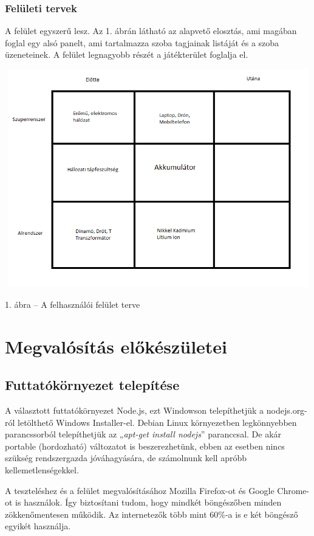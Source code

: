 \documentclass[]{article}
\begin{document}
\subsubsection{Felületi tervek}

A felület egyszerű lesz. Az 1. ábrán látható az alapvető elosztás, ami
magában foglal egy alsó panelt, ami tartalmazza szoba tagjainak listáját
és a szoba üzeneteinek. A felület legnagyobb részét a játékterület
foglalja el.

\includegraphics[width=5.375in,height=3.73238in]{media/image1.png}

1. ábra -- A felhasználói felület terve


\section{Megvalósítás
előkészületei}


\subsection{Futtatókörnyezet
telepítése}

A választott futtatókörnyezet Node.js, ezt Windowson telepíthetjük a
nodejs.org-ról letölthető Windows Installer-el. Debian Linux
környezetben legkönnyebben parancssorból telepíthetjük az „\emph{apt-get
install nodejs}'' paranccsal. De akár portable (hordozható) változatot
is beszerezhetünk, ebben az esetben nincs szükség rendszergazda
jóváhagyására, de számolnunk kell apróbb kellemetlenségekkel.

A teszteléshez és a felület megvalósításához Mozilla Firefox-ot és
Google Chrome-ot is használok. Így biztosítani tudom, hogy mindkét
böngészőben minden zökkenőmentesen működik. Az internetezők több mint
60\%-a is e két böngésző egyikét használja.
\end{document}
